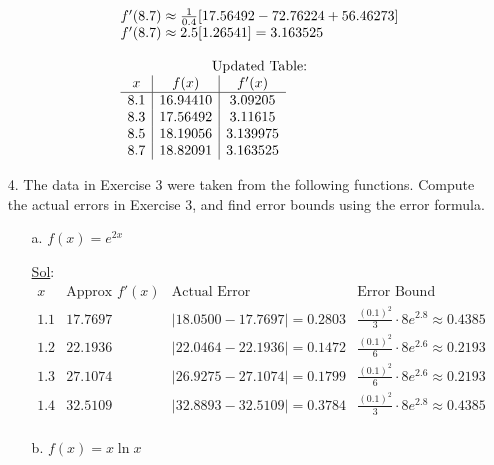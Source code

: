 \begin{enumerate}
\begin{enumerate}
\[\begin{array}{l}
            f'(8.7) \approx \frac{1}{0.4}[17.56492 - 72.76224 + 56.46273] \\
            f'(8.7) \approx 2.5[1.26541] = 3.163525 \\ \\
            \multicolumn{1}{c}{\text{Updated Table:}} \\
            \begin{array}{c|c|c}
            x & f(x) & f'(x) \\
            \hline
            8.1 & 16.94410 & 3.09205 \\
            8.3 & 17.56492 & 3.11615 \\
            8.5 & 18.19056 & 3.139975 \\
            8.7 & 18.82091 & 3.163525 \\
            \end{array}
            \end{array}
        \]
    \end{enumerate}

    \item[4.] The data in Exercise 3 were taken from the following functions. Compute the actual errors in Exercise 3, and find error bounds using the error formula. 
    
      \begin{enumerate}
        \item[a.] \(f(x) = e^{2x}\)
        
        \underline{Sol}:\\
        
        \[
            \begin{array}{c|c|c|c}
              x & \text{Approx } f'(x) & \text{Actual Error} & \text{Error Bound} \\
              \hline
              1.1 & 17.7697 & |18.0500 - 17.7697| = 0.2803 & \tfrac{(0.1)^2}{3} \cdot 8e^{2.8} \approx 0.4385 \\
              1.2 & 22.1936 & |22.0464 - 22.1936| = 0.1472 & \tfrac{(0.1)^2}{6} \cdot 8e^{2.6} \approx 0.2193 \\
              1.3 & 27.1074 & |26.9275 - 27.1074| = 0.1799 & \tfrac{(0.1)^2}{6} \cdot 8e^{2.6} \approx 0.2193 \\
              1.4 & 32.5109 & |32.8893 - 32.5109| = 0.3784 & \tfrac{(0.1)^2}{3} \cdot 8e^{2.8} \approx 0.4385 \\
            \end{array}
        \]

        \item[b.] \(f(x) = x \ln x\)
        

\end{enumerate}
\end{enumerate}
